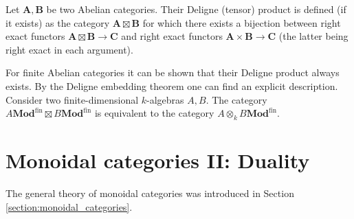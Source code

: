     \begin{construct}
        Let $\mathbf{A},\mathbf{B}$ be two Abelian categories. Their Deligne (tensor) product is defined (if it exists) as the category $\mathbf{A}\boxtimes\mathbf{B}$ for which there exists a bijection between right exact functors $\mathbf{A}\boxtimes\mathbf{B}\rightarrow\mathbf{C}$ and right exact functors $\mathbf{A}\times\mathbf{B}\rightarrow\mathbf{C}$ (the latter being right exact in each argument).

        For finite Abelian categories it can be shown that their Deligne product always exists. By the Deligne embedding theorem one can find an explicit description. Consider two finite-dimensional $k$-algebras $A, B$. The category $A\mathbf{Mod}^\mathrm{fin}\boxtimes B\mathbf{Mod}^\mathrm{fin}$ is equivalent to the category $A\otimes_kB\mathbf{Mod}^\mathrm{fin}$.
    \end{construct}

\section{Monoidal categories II: Duality}\label{section:duality}

    The general theory of monoidal categories was introduced in Section \ref{section:monoidal_categories}.

